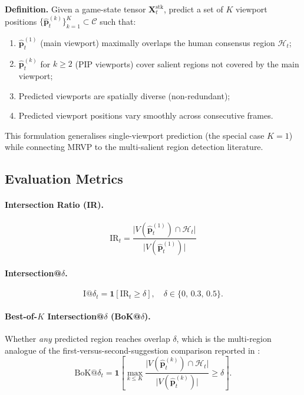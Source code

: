 \documentclass[preprint,12pt]{elsarticle}
\begin{document}
\textbf{Definition.} Given a game-state tensor $\mathbf{X}^{\text{stk}}_t$, 
predict a set of $K$ viewport positions 
$\{\hat{\mathbf{p}}^{(k)}_t\}_{k=1}^{K} \subset \mathcal{C}$ such that:
\begin{enumerate}
  \item $\hat{\mathbf{p}}^{(1)}_t$ (main viewport) maximally overlaps the 
        human consensus region $\mathcal{H}_t$;
  \item $\hat{\mathbf{p}}^{(k)}_t$ for $k \ge 2$ (PIP viewports) cover 
        salient regions not covered by the main viewport;
  \item Predicted viewports are spatially diverse (non-redundant);
  \item Predicted viewport positions vary smoothly across consecutive frames.
\end{enumerate}

This formulation generalises single-viewport prediction (the special case 
$K=1$) while connecting MRVP to the multi-salient region detection literature.

\subsection{Evaluation Metrics}

\paragraph{Intersection Ratio (IR).}
\begin{equation}
  \text{IR}_t = \frac{\bigl|V(\hat{\mathbf{p}}^{(1)}_t) \cap \mathcal{H}_t\bigr|}
                     {\bigl|V(\hat{\mathbf{p}}^{(1)}_t)\bigr|}
  \label{eq:ir}
\end{equation}

\paragraph{Intersection@$\delta$.}
\begin{equation}
  \text{I@}\delta_t = \mathbf{1}[\text{IR}_t \ge \delta],\quad
  \delta \in \{0,\, 0.3,\, 0.5\}.
  \label{eq:iat}
\end{equation}

\paragraph{Best-of-$K$ Intersection@$\delta$ (BoK@$\delta$).}
Whether \emph{any} predicted region reaches overlap $\delta$, which is the
multi-region analogue of the first-versus-second-suggestion comparison reported
in \cite{chen2018learning}:
\begin{equation}
  \text{BoK@}\delta_t = \mathbf{1}\!\left[\max_{k \le K}
    \frac{\bigl|V(\hat{\mathbf{p}}^{(k)}_t) \cap \mathcal{H}_t\bigr|}
         {\bigl|V(\hat{\mathbf{p}}^{(k)}_t)\bigr|} \ge \delta\right].
  \label{eq:bok}
\end{equation}
\end{document}
